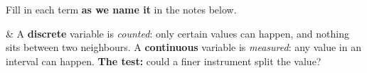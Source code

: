 \documentclass[12pt]{article}
\begin{document}

\vspace{2pt}

\boxguard[16]
\begin{vocabbox}
\small
Fill in each term \textbf{as we name it} in the notes below.
\par
{}
\par
{}
\par
{}
\par
{}
\par
\end{vocabbox}

\small
\begin{guidednotes}
 &
A \textbf{discrete} variable is \emph{counted}: only certain values can happen, and nothing sits
between two neighbours. A \textbf{continuous} variable is \emph{measured}: any value in an
interval can happen. \textbf{The test:} could a finer instrument split the value?


\end{guidednotes}
\end{document}
